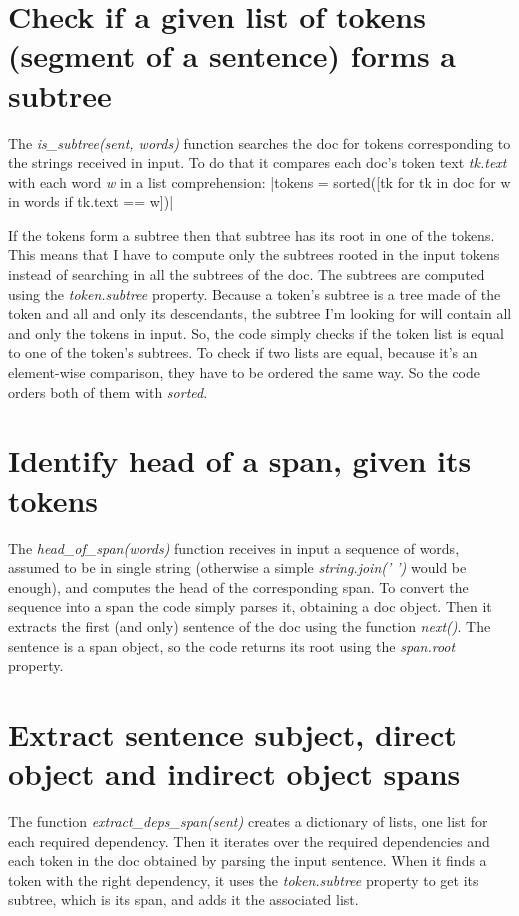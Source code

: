 \documentclass[a4paper]{article}
\begin{document}
\section{Check if a given list of tokens (segment of a sentence) forms a subtree}
The \textit{is\_subtree(sent, words)} function searches the doc for tokens corresponding to the strings received in input. To do that it compares each doc's token text \textit{tk.text} with each word \textit{w} in a list comprehension:
|tokens = sorted([tk for tk in doc for w in words if tk.text == w])|

If the tokens form a subtree then that subtree has its root in one of the tokens. This means that I have to compute only the subtrees rooted in the input tokens instead of searching in all the subtrees of the doc. The subtrees are computed using the \textit{token.subtree} property. Because a token's subtree is a tree made of the token and all and only its descendants, the subtree I'm looking for will contain all and only the tokens in input. So, the code simply checks if the token list is equal to one of the token's subtrees. To check if two lists are equal, because it's an element-wise comparison, they have to be ordered the same way. So the code orders both of them with \textit{sorted}.

\section{Identify head of a span, given its tokens}
The \textit{head\_of\_span(words)} function receives in input a sequence of words, assumed to be in single string (otherwise a simple \textit{string.join(' ')} would be enough), and computes the head of the corresponding span. To convert the sequence into a span the code simply parses it, obtaining a doc object. Then it extracts the first (and only) sentence of the doc using the function \textit{next()}. The sentence is a span object, so the code returns its root using the \textit{span.root} property.

\section{Extract sentence subject, direct object and indirect object spans}
The function \textit{extract\_deps\_span(sent)} creates a dictionary of lists, one list for each required dependency. Then it iterates over the required dependencies and each token in the doc obtained by parsing the input sentence. When it finds a token with the right dependency, it uses the \textit{token.subtree} property to get its subtree, which is its span, and adds it the associated list.
\end{document}
